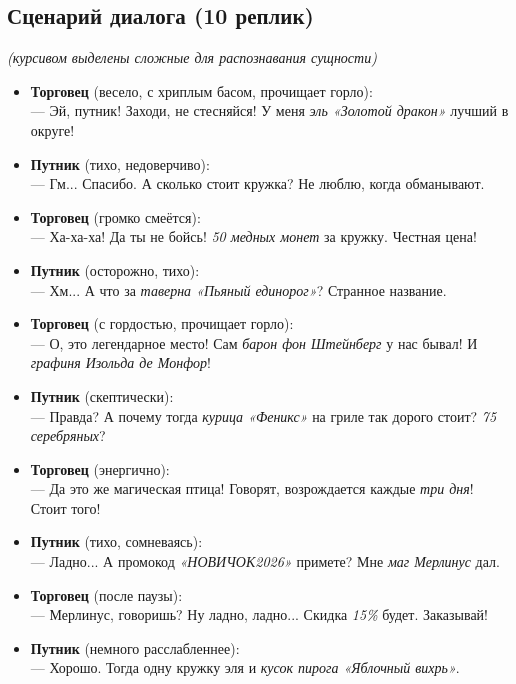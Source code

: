 \documentclass[oneside,a4paper,14pt]{extarticle}
\begin{document}
\subsection{Сценарий диалога (10 реплик)}
\noindent\textit{(курсивом выделены сложные для распознавания сущности)}
\begin{itemize}
    \item \textbf{Торговец} (весело, с хриплым басом, прочищает горло): \\
    --- Эй, путник! Заходи, не стесняйся! У меня \textit{эль «Золотой дракон»} лучший в округе!
    \item \textbf{Путник} (тихо, недоверчиво): \\
    --- Гм... Спасибо. А сколько стоит кружка? Не люблю, когда обманывают.
    \item \textbf{Торговец} (громко смеётся): \\
    --- Ха-ха-ха! Да ты не бойсь! \textit{50 медных монет} за кружку. Честная цена!
    \item \textbf{Путник} (осторожно, тихо): \\
    --- Хм... А что за \textit{таверна «Пьяный единорог»}? Странное название.
    \item \textbf{Торговец} (с гордостью, прочищает горло): \\
    --- О, это легендарное место! Сам \textit{барон фон Штейнберг} у нас бывал! И \textit{графиня Изольда де Монфор}!
    \item \textbf{Путник} (скептически): \\
    --- Правда? А почему тогда \textit{курица «Феникс»} на гриле так дорого стоит? \textit{75 серебряных}?
    \item \textbf{Торговец} (энергично): \\
    --- Да это же магическая птица! Говорят, возрождается каждые \textit{три дня}! Стоит того!
    \item \textbf{Путник} (тихо, сомневаясь): \\
    --- Ладно... А промокод \textit{«НОВИЧОК2026»} примете? Мне \textit{маг Мерлинус} дал.
    \item \textbf{Торговец} (после паузы): \\
    --- Мерлинус, говоришь? Ну ладно, ладно... Скидка \textit{15\%} будет. Заказывай!
    \item \textbf{Путник} (немного расслабленнее): \\
    --- Хорошо. Тогда одну кружку эля и \textit{кусок пирога «Яблочный вихрь»}.
\end{itemize}
\end{document}
